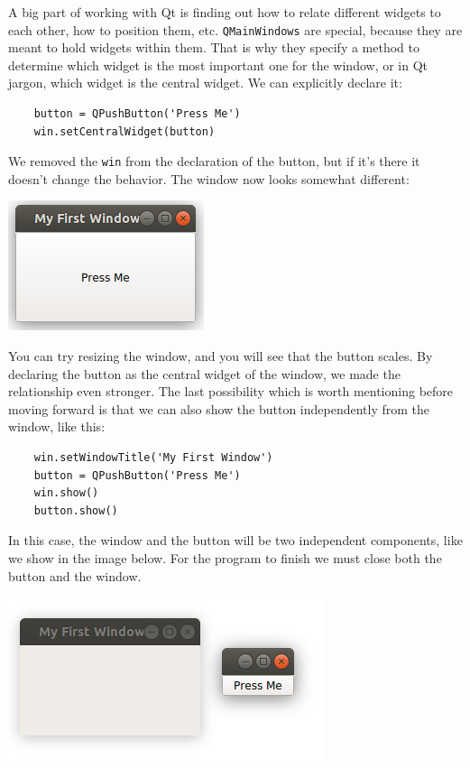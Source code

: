 
A big part of working with Qt is finding out how to relate different widgets to each other, how to position them, etc. \texttt{QMainWindows} are special, because they are meant to hold widgets within them. That is why they specify a method to determine which widget is the most important one for the window, or in Qt jargon, which widget is the central widget. We can explicitly declare it:

\begin{verbatim}
    button = QPushButton('Press Me')
    win.setCentralWidget(button)
\end{verbatim}

We removed the \texttt{win} from the declaration of the button, but if it's there it doesn't change the behavior. The window now looks somewhat different:

\begin{center}
    \includegraphics[width=.3\textwidth]{images/Chapter_08/03_simple_window_and_central_widget.png}
\end{center}

You can try resizing the window, and you will see that the button scales. By declaring the button as the central widget of the window, we made the relationship even stronger. The last possibility which is worth mentioning before moving forward is that we can also show the button independently from the window, like this:

\begin{verbatim}
    win.setWindowTitle('My First Window')
    button = QPushButton('Press Me')
    win.show()
    button.show()
\end{verbatim}

In this case, the window and the button will be two independent components, like we show in the image below. For the program to finish we must close both the button and the window.

\begin{center}
    \includegraphics[width=.3\textwidth]{images/Chapter_08/04_window_button_separated.png}
\end{center}

